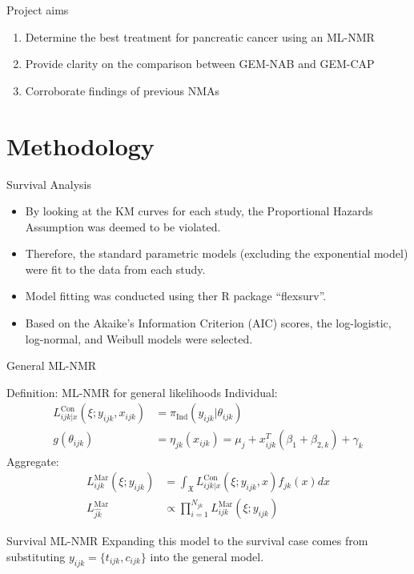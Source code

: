\documentclass{beamer}
\begin{document}
\begin{frame}{Project aims}
    \begin{enumerate}
        \item Determine the best treatment for pancreatic cancer using an ML-NMR
        \pause
        \item Provide clarity on the comparison between GEM-NAB and GEM-CAP
        \pause
        \item Corroborate findings of previous NMAs
    \end{enumerate} 
\end{frame} 

\section{Methodology}

\begin{frame}{Survival Analysis}
    \begin{itemize}
        \item By looking at the KM curves for each study, the Proportional Hazards Assumption was deemed to be violated.
        \pause
        \item Therefore, the standard parametric models (excluding the exponential model) were fit to the data from each study.
        \pause
        \item Model fitting was conducted using ther R package ``flexsurv''.
        \pause
        \item Based on the Akaike's Information Criterion (AIC) scores, the log-logistic, log-normal, and Weibull models were selected. 
    \end{itemize}   
\end{frame} 

\begin{frame}{General ML-NMR}
    \begin{block}{Definition: ML-NMR for general likelihoods}
    Individual:
    \begin{align}
        L_{ijk|x}^{\text{Con}}(\xi;y_{ijk},x_{ijk}) &= \pi_{\text{Ind}}(y_{ijk}|\theta_{ijk}) \\
        g(\theta_{ijk}) &= \eta_{jk}(x_{ijk}) = \mu_j + x_{ijk}^T(\beta_1 + \beta_{2,k}) + \gamma_k \label{mlnmragg}
    \end{align}
    Aggregate:
    \begin{align}
        L_{ijk}^{\text{Mar}}(\xi; y_{ijk}) &= \int_{\mathfrak{X}} L_{ijk|x}^{\text{Con}}(\xi; y_{ijk}, x)f_{jk}(x)dx \label{mlnnmrint}\\
        L_{\hat{jk}}^{\text{Mar}} &\propto \prod_{i = 1}^{N_{jk}}L_{ijk}^{\text{Mar}}(\xi; y_{ijk})
    \end{align}
    \end{block}
\end{frame}

\begin{frame}{Survival ML-NMR}
    Expanding this model to the survival case comes from substituting $y_{ijk} = \{t_{ijk}, c_{ijk}\}$ into the general model. 
    
\end{frame}
\end{document}
